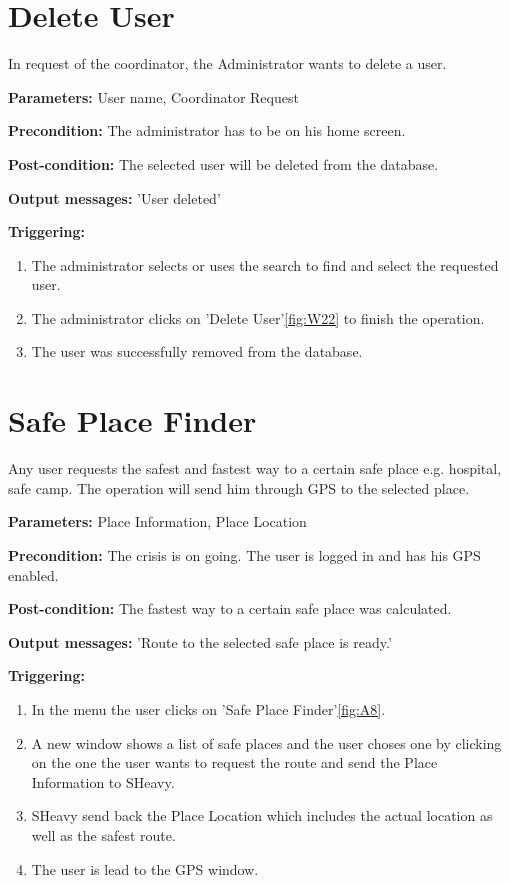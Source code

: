 \section{Delete User}
\label{operation:UpgradeUser}
In request of the coordinator, the Administrator wants to delete a user.\\
\begin{description}
\item \textbf{Parameters:} User name, Coordinator Request
\item \textbf{Precondition:} The administrator has to be on his home screen.
\item \textbf{Post-condition:}  The selected user will be deleted from the
database.
\item \textbf{Output messages:} 'User deleted'
\item \textbf{Triggering:}
\begin{enumerate}
\item The administrator selects or uses the search to find and select the
requested user.
\item The administrator clicks on 'Delete User'\ref{fig:W22} to finish the
operation.
\item The user was successfully removed from the database.
\end{enumerate}
\end{description}


\section{Safe Place Finder}
\label{operation:SafePlaceFinder}
Any user requests the safest and fastest way to a certain safe place e.g. hospital,
safe camp. The operation will send him through GPS to the selected place.\\
\begin{description}
\item \textbf{Parameters:} Place Information, Place Location
\item \textbf{Precondition:} The crisis is on going. The user is logged in and
has his GPS enabled.
\item \textbf{Post-condition:}  The fastest way to a certain safe place was
calculated.
\item \textbf{Output messages:} 'Route to the selected safe place is ready.'
\item \textbf{Triggering:}
\begin{enumerate}
\item In the menu the user clicks on 'Safe Place Finder'\ref{fig:A8}.
\item A new window shows a list of safe places and the user choses one by 
clicking on the one the user wants to request the route and send the Place Information to SHeavy.
\item SHeavy send back the Place Location which includes the actual location as well as the safest route.
\item The user is lead to the GPS window.
\end{enumerate}
\end{description}


